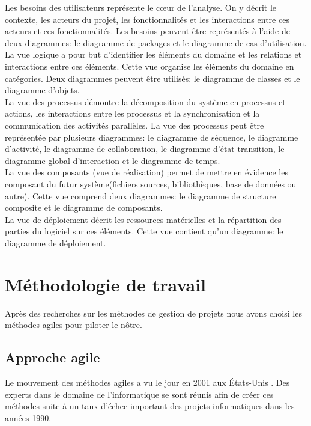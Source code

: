 Les besoins des utilisateurs représente le cœur de l'analyse. On y décrit le contexte, les acteurs du projet, les fonctionnalités et les interactions entre ces acteurs et ces fonctionnalités.
Les besoins peuvent être représentés à l'aide de deux diagrammes: le diagramme de packages et le diagramme de cas d'utilisation.\\

La vue logique a pour but d'identifier les éléments du domaine et les relations et interactions entre ces éléments. Cette vue organise les éléments du domaine en catégories. Deux diagrammes peuvent être utilisés: le diagramme de classes et le diagramme d'objets.\\

La vue des processus démontre la décomposition du système en processus et actions, les interactions entre les processus et la synchronisation et la communication des activités parallèles. La vue des processus peut être représentée par plusieurs diagrammes: le diagramme de séquence, le diagramme d'activité, le diagramme de collaboration, le diagramme d'état-transition, le diagramme global d'interaction et le diagramme de temps.\\

La vue des composants (vue de réalisation) permet de mettre en évidence les composant du futur système(fichiers sources, bibliothèques, base de données ou autre). Cette vue comprend deux diagrammes: le diagramme de structure composite et le diagramme de composants.\\

La vue de déploiement décrit les ressources matérielles et la répartition des parties du logiciel sur ces éléments. Cette vue contient qu'un diagramme: le diagramme de déploiement\cite{UMLDiagrams}.\\

\section{Méthodologie de travail}
Après des recherches sur les méthodes de gestion de projets nous avons choisi les méthodes agiles pour piloter le nôtre.
\subsection{Approche agile}
Le mouvement des méthodes agiles a vu le jour en 2001 aux États-Unis \cite{Agile}. Des experts dans le domaine de l'informatique se sont réunis afin de créer ces méthodes suite à un taux d'échec important des projets informatiques dans les années 1990.\\

